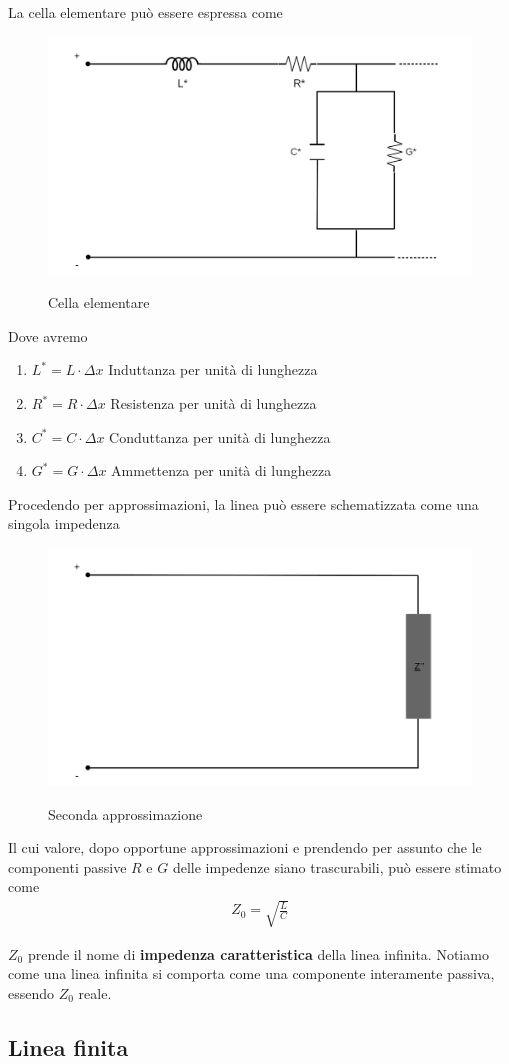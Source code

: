 \documentclass[a4paper,12pt]{report}
\begin{document}
La cella elementare può essere espressa come
\begin{figure}[!htb]
	\centering
	\includegraphics[width=.3\textwidth]{pictures/linea6.png}
	\label{ergwg}
	\caption{\label{luegregegl} \small Cella elementare}
\end{figure}
Dove avremo
\begin{enumerate}
	\item $L^* = L \cdot \Delta x$ Induttanza per unità di lunghezza
	\item $R^* = R \cdot \Delta x$ Resistenza per unità di lunghezza
	\item $C^* = C \cdot \Delta x$ Conduttanza per unità di lunghezza
	\item $G^* = G \cdot \Delta x$ Ammettenza per unità di lunghezza
\end{enumerate}

\newpage

Procedendo per approssimazioni, la linea può essere schematizzata come una singola impedenza
\begin{figure}[!htb]
	\centering
	\includegraphics[width=.2\textwidth]{pictures/linea4.png}
	\label{fig:largenenough}
	\caption{\label{kekw} \small Seconda approssimazione}
\end{figure}

Il cui valore, dopo opportune approssimazioni e prendendo per assunto che le componenti passive $R$ e $G$ delle impedenze siano trascurabili, può essere stimato come
\begin{align}
Z_0 = \sqrt{\frac{L}{C}}
\end{align}

$Z_0$ prende il nome di \textbf{impedenza caratteristica} della linea infinita. Notiamo come una linea infinita si comporta come una componente interamente passiva, essendo $Z_0$ reale.


\subsection{Linea finita}
\end{document}
